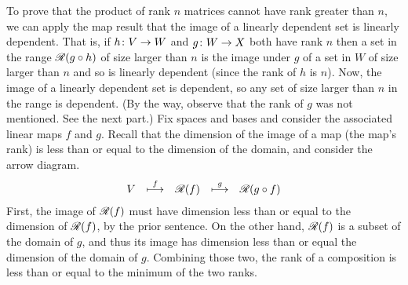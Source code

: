 \begin{exercises}
\begin{answer}
\begin{exparts}
        To prove that the product of rank \( n \) matrices cannot have rank
        greater than \( n \), we can  apply the map result that the image of a
        linearly dependent set is linearly dependent.
        That is, if \( \mbox{$h\colon V\to W$} \) and \( \mbox{$g\colon W\to X$} \) both have rank
        \( n \) then a set in the range 
        \( \mathscr{R}(g\mathbin\circ h)  \) of size
        larger than \( n \) is the image under \( g \) of a set in \( W \) of
        size larger than \( n \) and so is linearly dependent
        (since the rank of \( h \) is \( n \)).
        Now, the image of a linearly dependent set is dependent, so any set of
        size larger than \( n \) in the range is dependent.
        (By the way, observe that the rank of \( g \) was not mentioned.
        See the next part.)  
       \partsitem Fix spaces and bases and consider the associated linear maps
          \( f \) and \( g \).
          Recall that the dimension of the image of a map (the map's rank) is
          less than or equal to the dimension of the domain, and consider
          the arrow diagram.
          \begin{equation*}
            \begin{matrix}
              V &\stackrel{f}{\longmapsto} &\mathscr{R}(f) &\stackrel{g}{\longmapsto}
                &\mathscr{R}(g\mathbin\circ f)
            \end{matrix}
          \end{equation*}
          First, the image of \( \mathscr{R}(f) \) must have dimension
          less than or equal to the dimension of \( \mathscr{R}(f) \),
          by the prior sentence.
          On the other hand, \( \mathscr{R}(f) \) is a subset of
          the domain of \( g \), and thus its image has dimension less than
          or equal the dimension of the domain of \( g \).
          Combining those two,
          the rank of a composition is less than or equal to the minimum
          of the two ranks.


\end{exparts}
\end{answer}
\end{exercises}
